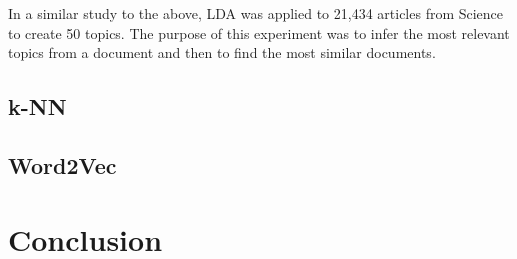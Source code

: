In a similar study to the above, LDA was applied to 21,434 articles from Science to create 50 topics.
The purpose of this experiment was to infer the most relevant topics from a document and then to find the most similar documents.

\subsection{k-NN}

\subsection{Word2Vec}

\section{Conclusion}
